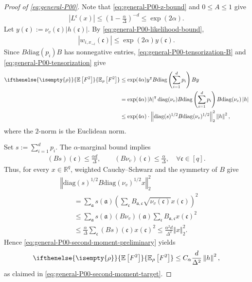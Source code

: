 \documentclass[a4paper,12pt]{article}
\theoremstyle{plain}
\theoremstyle{definition}
\def\-#1{\mathrm{#1}} %
\def\!#1{\mathfrak{#1}} %
\def\-#1{\mathrm{#1}} %
\def\!#1{\mathfrak{#1}} %
\def\oE{\mathbb{E}}
\newcommand{\E}[2][]{ \ifthenelse{\isempty{#1}}
  {\oE\left[#2\right]}
  {\oE_{#1}\left[#2\right]} }
\newcommand{\norm}[1]{\left\Vert#1\right\Vert}
\newcommand{\tuple}[1]{\left(#1\right)}
\newcommand{\tp}{\tuple}
\newcommand{\abs}[1]{\left\vert#1\right\vert}
\begin{document}
\begin{proof}[Proof of \eqref{eq:general-P00}]
Note that \eqref{eq:general-P00-z-bound} and $0\leq A\leq1$ give
\begin{align}
  \abs{L^{\!c}(x)}
  \leq
  \tp{1-\frac{\alpha}{\Delta}}^{-d}
  \leq\exp(2\alpha).
  \label{eq:general-P00-likelihood-bound}
\end{align}
%
Let $y(\!c):=\nu_v(\!c)\abs{h(\!c)}$.  By
\eqref{eq:general-P00-likelihood-bound},
\begin{align*}
  \abs{w_{i,x_{\sim i}}(\!c)}
  \leq\exp(2\alpha)y(\!c).
\end{align*}
Since $B\-{diag}(p_i)B$ has nonnegative entries,
\eqref{eq:general-P00-tensorization-B} and \eqref{eq:general-P00-tensorization} give
\begin{align}
  \E[\rho]{F^2}
  \nonumber
  &\leq
  \exp(4\alpha)
  y^\intercal
  B\-{diag}\tp{\sum_{i=1}^d p_i}B
  y \\
  \nonumber
  &=
  \exp(4\alpha)
  \abs{h}^\intercal\mathrm{diag}(\nu_v)
  B\-{diag}\tp{\sum_{i=1}^d p_i}B
  \mathrm{diag}(\nu_v)\abs{h} \\
  &\leq 
    \exp(4\alpha) \cdot
    \norm{
    \-{diag}(s)^{1/2}
    B
    \-{diag}(\nu_v)^{1/2}
    }_{2}^2 \norm{h}^2,
  \label{eq:general-P00-second-moment-preliminary}
\end{align}
where the $2$-norm is the Euclidean norm.

Set $s:=\sum_{i=1}^d p_i$.  The $\alpha$-marginal bound implies
\begin{align*}
  (Bs)(\!c)
  \leq\frac{\alpha d}{\Delta},
  \qquad
  (B\nu_v)(\!c)
  \leq\frac{\alpha}{\Delta},
  \quad \forall \!c \in [q].
\end{align*}
Thus, for every $x\in\mathbb R^q$, weighted
Cauchy--Schwarz and the symmetry of $B$ give
\begin{align*}
  &\norm{
    \-{diag}(s)^{1/2}
    B
    \-{diag}(\nu_v)^{1/2}x
  }_2^2
  \\
  &\qquad=
  \sum_{\!a}s(\!a)
  \tp{
    \sum_{\!c}B_{\!a,\!c}
    \sqrt{\nu_v(\!c)}x(\!c)
  }^2
  \\
  &\qquad\leq
  \sum_{\!a}s(\!a)(B\nu_v)(\!a)
  \sum_{\!c}B_{\!a,\!c}x(\!c)^2
  \\
  &\qquad\leq
  \frac{\alpha}{\Delta}
  \sum_{\!c}(Bs)(\!c)x(\!c)^2
  \leq
  \frac{\alpha^2d}{\Delta^2}\norm{x}_2^2.
\end{align*}
Hence
\eqref{eq:general-P00-second-moment-preliminary} yields
\begin{align}
  \E[\rho]{F^2}
  \leq
  C_\alpha\frac{d}{\Delta^2}\norm{h}^2,
  \label{eq:general-P00-second-moment}
\end{align}
as claimed in \eqref{eq:general-P00-second-moment-target}.
\end{proof}
\end{document}
